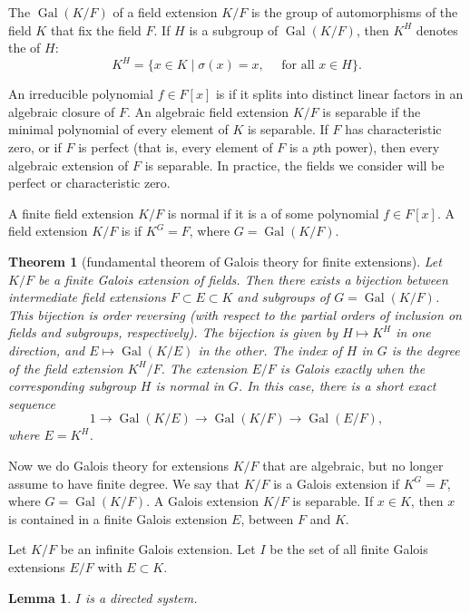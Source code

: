 \documentclass{amsart}
\newtheorem{theorem}[equation]{Theorem}
\newtheorem{lemma}[equation]{Lemma}
\def\op#1{{\operatorname{#1}}}
\def\oG{\op{Gal}}
\begin{document}
The  $\oG(K/F)$
of a field extension $K/F$ is the group of automorphisms
of the field $K$ that fix the field $F$.   If $H$ is a subgroup of
$\oG(K/F)$, then $K^H$ denotes the  of $H$:
\[
K^H= \{x \in K \mid \sigma(x) = x,\quad \text{ for all } x\in H\}.
\]


An irreducible polynomial $f\in F[x]$ is  if it splits
into distinct linear factors in an algebraic closure of $F$.
An algebraic field extension $K/F$ is separable if the minimal polynomial
of every element of $K$ is separable.  If $F$ has characteristic zero, or
if $F$ is perfect (that is, every element of $F$ is a $p$th power), then
every algebraic extension of $F$ is separable.  In practice, the fields
we consider will be perfect or characteristic zero.

A finite field extension $K/F$ is normal if it is a  of
some polynomial $f\in F[x]$.
A field extension $K/F$ is  if $K^G = F$, where $G=\oG(K/F)$.

\begin{theorem}[fundamental theorem of Galois theory for finite extensions]  
Let $K/F$ be a finite Galois extension of fields.
Then there exists a bijection between intermediate field extensions
$F\subset E\subset K$ and subgroups of $G=\oG(K/F)$.  This bijection
is order reversing (with respect to the partial orders of inclusion
on fields and subgroups, respectively).  The bijection is given by
$H\mapsto K^H$ in one direction, and $E\mapsto \oG(K/E)$ in the
other.   The index of $H$ in $G$ is the degree of the field extension $K^H/F$.
The extension $E/F$ is Galois exactly when the corresponding
subgroup $H$ is normal in $G$.  In this case, there is a short exact sequence
\[
1 \to \oG(K/E) \to \oG(K/F) \to \oG(E/F),
\]
where $E=K^H$.
\end{theorem}

Now we do Galois theory for extensions $K/F$ that are algebraic, but no longer
assume to have finite degree.  We say that $K/F$ is a Galois extension if
$K^G = F$, where $G=\oG(K/F)$.  A Galois extension $K/F$ is separable.
If $x\in K$, then $x$ is contained in a finite Galois extension $E$, between $F$ and $K$.

Let $K/F$ be an infinite Galois extension.  Let $I$ be the set of all finite
Galois extensions $E/F$ with $E\subset K$.

\begin{lemma} $I$ is a directed system.  
\end{lemma}
\end{document}
